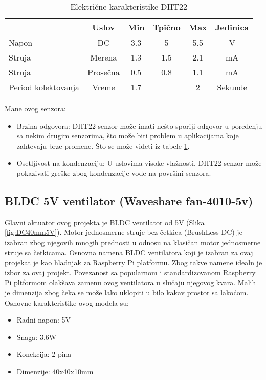 \documentclass[a4paper, 12pt]{article}
\begin{document}
\begin{table}[H]
\centering
\begin{tabular}{|l|c|c|c|c|c|}
\hline
& Uslov & Min & Tpično & Max & Jedinica\\
\hline
Napon & DC & 3.3 & 5 & 5.5 & V\\
\hline
Struja & Merena & 1.3 & 1.5 & 2.1 & mA\\
\hline
Struja & Prosečna & 0.5 & 0.8 & 1.1 & mA\\
\hline
Period kolektovanja & Vreme & 1.7 &  & 2 & Sekunde\\
\hline
\end{tabular}
\caption{Električne karakteristike DHT22} \label{tab:DHT22}
\end{table}

Mane ovog senzora: 
\begin{itemize}
\item Brzina odgovora: DHT22 senzor može imati nešto sporiji odgovor u poređenju sa nekim drugim senzorima, što može biti problem u aplikacijama koje zahtevaju brze promene. Što se može videti iz tabele \ref{tab:DHT22}.
\item Osetljivost na kondenzaciju: U uslovima visoke vlažnosti, DHT22 senzor može pokazivati greške zbog kondenzacije vode na površini senzora.
\end{itemize}

\pagebreak

	\subsection{BLDC 5V ventilator (Waveshare fan-4010-5v)}
	
	\vspace{10pt}
	
\begingroup
	
	Glavni aktuator ovog projekta je BLDC ventilator od 5V (Slika \ref{fig:DC40mm5V}). Motor jednosmerne struje bez četkica (BrushLess DC) je izabran zbog njegovih mnogih prednosti u odnosu na klasičan motor jednosmerne struje sa četkicama. Osnovna namena BLDC ventilatora koji je izabran za ovaj projekat je kao hladnjak za Raspberry Pi platformu. Zbog takve namene idealn je izbor za ovaj projekt. Povezanost sa popularnom i standardizovanom Raspberry Pi pltformom olakšava zamenu ovog ventilatora u slučaju njegovog kvara.  Malih je dimenzija zbog čeka se može lako uklopiti u bilo kakav prostor sa lakoćom. Osnovne karakteristike ovog modela su: 

\begin{itemize}
	\item Radni napon: 5V
	\item Snaga: 3.6W
	\item Konekcija: 2 pina
	\item Dimenzije: 40x40x10mm
\end{itemize}
\end{document}
